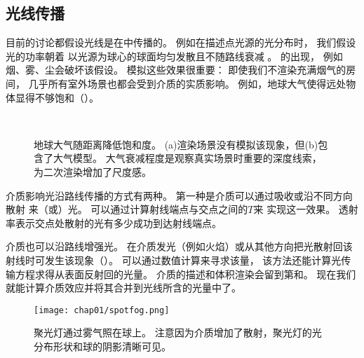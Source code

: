 \subsection{光线传播}\label{sub:光线传播}

目前的讨论都假设光线是在中传播的。
例如在描述点光源的光分布时，
我们假设光的功率朝着
以光源为球心的球面均匀发散且不随路线衰减
。
的出现，
例如烟、雾、尘会破坏该假设。
模拟这些效果很重要：
即使我们不渲染充满烟气的房间，
几乎所有室外场景也都会受到介质的实质影响。
例如，地球大气使得远处物体显得不够饱和（）。
\begin{figure}[htbp]
      \centering
      \\
      \caption{地球大气随距离降低饱和度。
            (a)渲染场景没有模拟该现象，但(b)包含了大气模型。
            大气衰减程度是观察真实场景时重要的深度线索，
            为二次渲染增加了尺度感。}
      \label{fig:1.9}
\end{figure}

介质影响光沿路线传播的方式有两种。
第一种是介质可以通过吸收或沿不同方向散射
来（或）光。
可以通过计算射线端点与交点之间的$T$来
实现这一效果。
透射率表示交点处散射的光有多少成功到达射线端点。

介质也可以沿路线增强光。
在介质发光（例如火焰）或从其他方向把光散射回该射线时可发生该现象（）。
可以通过数值计算来寻求该量，
该方法还能计算光传输方程求得从表面反射回的光量。
介质的描述和体积渲染会留到第和。
现在我们就能计算介质效应并将其合并到光线所含的光量中了。
\begin{figure}[htbp]
      \centering
      \texttt{[image: chap01/spotfog.png]}
      \caption{聚光灯通过雾气照在球上。
            注意因为介质增加了散射，聚光灯的光分布形状和球的阴影清晰可见。}
      \label{fig:1.10}
\end{figure}